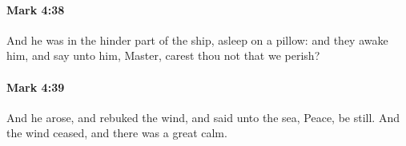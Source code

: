 		\paragraph{Mark 4:38} %
			\label{MARK-4-38}

			And he was in the hinder part of the ship, asleep on a pillow: and they awake him, and say unto him, Master, carest thou not that we perish?

			\begin{framed}
			\scriptsize
				\begin{compactdesc}
					\item[SBLG] 
				\end{compactdesc}
			\end{framed}

		\paragraph{Mark 4:39} %
			\label{MARK-4-39}

			And he arose, and rebuked the wind, and said unto the sea, Peace, be still. And the wind ceased, and there was a great calm.

